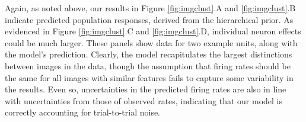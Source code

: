 \documentclass[10pt,letterpaper]{article}
\begin{document}
Again, as noted above, our results in Figure \ref{fig:imgclust}.A and \ref{fig:imgclust}.B indicate predicted population responses, derived from the hierarchical prior. As evidenced in Figure \ref{fig:imgclust}.C and \ref{fig:imgclust}.D, individual neuron effects could be much larger. These panels show data for two example units, along with the model's prediction. Clearly, the model recapitulates the largest distinctions between images in the data, though the assumption that firing rates should be the same for all images with similar features fails to capture some variability in the results. Even so, uncertainties in the predicted firing rates are also in line with uncertainties from those of observed rates, indicating that our model is correctly accounting for trial-to-trial noise.

\end{document}
